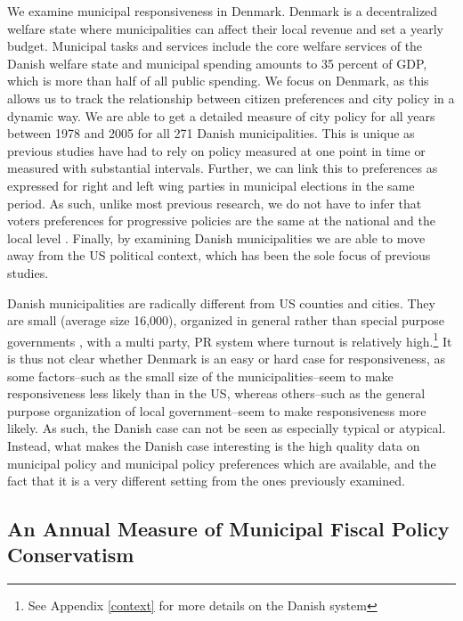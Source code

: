 \documentclass[a4paper,12pt]{article}
\begin{document}
 We examine municipal responsiveness in Denmark. Denmark is a decentralized welfare state where municipalities can affect their local revenue and set a yearly budget.  Municipal tasks and services include the core welfare services of the Danish welfare state and municipal spending amounts to 35 percent of GDP, which is more than half of all public spending. We focus on Denmark, as this allows us to track the relationship between citizen preferences and city policy in a dynamic way. We are able to get a detailed measure of city policy for all years between 1978 and 2005 for all 271 Danish municipalities. This is unique as previous studies have had to rely on policy measured at one point in time \citep{tausanovitch2014representation,palus2010responsiveness} or measured with substantial intervals\citep{sances2017voters,einstein2016pushing,hajnal2010or}. Further, we can link this to preferences as expressed for right and left wing parties in municipal elections in the same period. As such, unlike most previous research, we do not have to infer that voters preferences for progressive policies are the same at the national and the local level \citep[for an exception, see][]{tausanovitch2014representation}. Finally, by examining Danish municipalities we are able to move away from the US political context, which has been the sole focus of previous studies. 
 
Danish municipalities are radically different from US counties and cities. They are small (average size 16,000), organized in general rather than special purpose governments \citep{berry2009imperfect}, with a multi party, PR system where turnout is relatively high.\footnote{See Appendix \ref{context} for more details on the Danish system} It is thus not clear whether Denmark is an easy or hard case for responsiveness, as some factors--such as the small size of the municipalities--seem to make responsiveness less likely than in the US, whereas others--such as the general purpose organization of local government--seem to make responsiveness more likely. As such, the Danish case can not be seen as especially typical or atypical. Instead, what makes the Danish case interesting is the high quality data on municipal policy and municipal policy preferences which are available, and the fact that it is a very different setting from the ones previously examined.


\subsection*{An Annual Measure of Municipal Fiscal Policy Conservatism}
\end{document}
